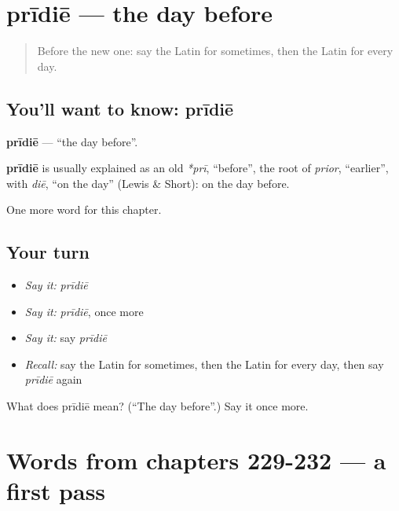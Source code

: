 \section[prīdiē]{prīdiē — the day before}

\label{lesson:LA-C237-pridie}



\begin{quote}
Before the new one: say the Latin for sometimes, then the Latin for every day.
\end{quote}

\subsection*{You'll want to know: prīdiē}
\textbf{prīdiē} — \textquotedblleft{}the day before\textquotedblright{}.

\begin{cousinweb}
\textbf{prīdiē} is usually explained as an old \emph{*prī}, \textquotedblleft{}before\textquotedblright{}, the root of \emph{prior}, \textquotedblleft{}earlier\textquotedblright{}, with \emph{diē}, \textquotedblleft{}on the day\textquotedblright{} (Lewis \& Short): on the day before.
\end{cousinweb}

\begin{grammarlens}[title={What you've built}]
One more word for this chapter.
\end{grammarlens}

\subsection*{Your turn}
\begin{itemize}
\raggedright
  \item \emph{Say it:} \emph{prīdiē}
  \item \emph{Say it:} \emph{prīdiē}, once more
  \item \emph{Say it:} say \emph{prīdiē}
  \item \emph{Recall:} say the Latin for sometimes, then the Latin for every day, then say \emph{prīdiē} again
\end{itemize}

\begin{tcolorbox}[breakable,colback=teal!4,colframe=teal!35!black,title={Before you move on}]
What does prīdiē mean? (\textquotedblleft{}The day before\textquotedblright{}.) Say it once more.
\end{tcolorbox}
\section[(dialogue)]{Words from chapters 229-232 — a first pass}

